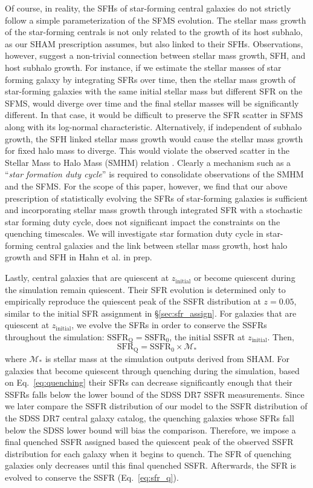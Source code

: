 \documentclass[iop,apj,tighten,twocolappendix,numberedappendix]{emulateapj}
\newcommand{\beq}{\begin{equation}}
\newcommand{\eeq}{\end{equation}}
\newcommand{\zinit}{z_\mathrm{initial}}
\begin{document}
Of course, in reality, the SFHs of star-forming central 
galaxies do not strictly follow a simple parameterization of
the SFMS evolution. The stellar mass growth of
the star-forming centrals is not only related to the growth 
of its host subhalo, as our SHAM prescription assumes, but 
also linked to their SFHs. Observations, however, suggest 
a non-trivial connection between stellar mass growth, SFH, 
and host subhalo growth. For instance, if we estimate the 
stellar masses of star forming galaxy by integrating SFRs over time, 
then the stellar mass growth of star-forming galaxies with the same 
initial stellar mass but different SFR on the SFMS, would diverge 
over time and the final stellar masses will be significantly different. 
In that case, it would be difficult to preserve the SFR scatter 
in SFMS along with its log-normal characteristic. 
Alternatively, if independent of subhalo growth, the SFH linked 
stellar mass growth would cause the stellar mass growth for fixed
halo mass to diverge. This would violate the observed 
scatter in the Stellar Mass to Halo Mass (SMHM) relation 
\citep{Leauthaud:2012aa, Tinker:2013aa, Zu:2015aa, Gu:2016aa}.
Clearly a mechanism such as a ``{\em star formation duty cycle}'' 
is required to consolidate observations of the SMHM and the SFMS. 
For the scope of this paper, however, we find that our above
prescription of statistically evolving the SFRs of 
star-forming galaxies is sufficient and incorporating 
stellar mass growth through integrated SFR with a stochastic  
star forming duty cycle, does not significant impact the 
constraints on the quenching timescales. We will investigate 
star formation duty cycle in star-forming central galaxies 
and the link between stellar mass growth, host halo growth
and SFH in Hahn et al. in prep.

Lastly, central galaxies that are quiescent at $\zinit$ 
or become quiescent during the simulation remain quiescent.
Their SFR evolution is determined only to empirically 
reproduce the quiescent peak of the SSFR distribution at $z=0.05$, similar to the 
initial SFR assignment in \S\ref{sec:sfr_assign}. For 
galaxies that are quiescent at $\zinit$, we evolve the 
SFRs in order to conserve the SSFRs throughout the 
simulation: $\mathrm{SSFR}_\mathrm{Q} = \mathrm{SSFR}_0$, 
the initial SSFR at $\zinit$. Then, 
\beq \label{eq:sfr_q}
\mathrm{SFR}_\mathrm{Q} = \mathrm{SSFR}_0 \times \mathcal{M}_*
\eeq
where $\mathcal{M}_*$ is stellar mass at the simulation outputs 
derived from SHAM. 
For galaxies that become quiescent through 
quenching during the simulation, based on Eq.~\ref{eq:quenching}
their SFRs can decrease significantly enough that their SSFRs 
falls below the lower bound of the SDSS DR7 SSFR measurements.
Since we later compare the SSFR distribution of our model to the 
SSFR distribution of the SDSS DR7 central galaxy catalog, 
the quenching galaxies whose SFRs fall below the SDSS 
lower bound will bias the comparison. Therefore, we impose a 
final quenched SSFR assigned based the quiescent peak of 
the observed SSFR distribution for each galaxy when it 
begins to quench. The SFR of quenching galaxies only
decreases until this final quenched SSFR. Afterwards, the
SFR is evolved to conserve the SSFR (Eq.~\ref{eq:sfr_q}). 
\end{document}
